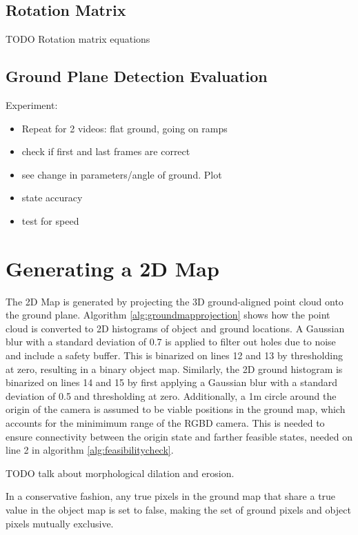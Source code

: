 \subsection{Rotation Matrix}
TODO Rotation matrix equations

\subsection{Ground Plane Detection Evaluation}
Experiment: 
\begin{itemize}
\item Repeat for 2 videos: flat ground, going on ramps
\item check if first and last frames are correct
\item see change in parameters/angle of ground. Plot
\item state accuracy
\item test for speed
\end{itemize}

\section{Generating a 2D Map}
\label{sec:2dmap}
The 2D Map is generated by projecting the 3D ground-aligned point cloud onto the
ground plane.
Algorithm \autoref{alg:groundmapprojection} shows how the point cloud is
converted to 2D histograms of object and ground locations. 
A Gaussian blur with
a standard deviation of 0.7 is applied to filter out holes due to noise and
include a safety buffer. This is binarized on lines 12 and 13 by thresholding at
zero, resulting in a binary object map.
Similarly, the 2D ground histogram is binarized on lines 14 and 15 by first applying a Gaussian
blur with a standard deviation of 0.5 and thresholding at zero. 
Additionally, a 1m circle around the origin of the camera is assumed to be
viable positions in the ground map, which accounts for the minimimum range of
the RGBD camera. This is needed to ensure connectivity between the origin state
and farther feasible states, needed on line 2 in algorithm
\autoref{alg:feasibilitycheck}.

TODO talk about morphological dilation and erosion.

In a conservative fashion, any true pixels in the ground map that share a true
value in the object map is set to false, making the set of ground pixels and
object pixels mutually exclusive. 

